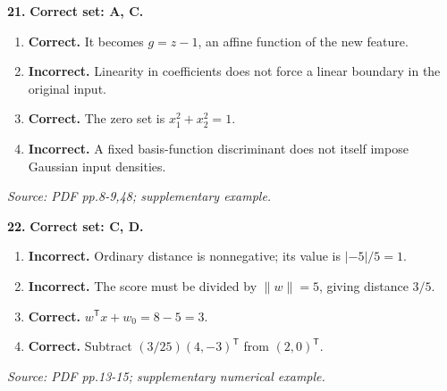 \documentclass[11pt,a4paper]{article}
\begin{document}
\par\noindent\begin{minipage}{\linewidth}
\textbf{21.} \textbf{Correct set: A, C.}
\begin{enumerate}[label=(\Alph*),leftmargin=8mm,itemsep=2pt,topsep=2pt]
\item \textbf{Correct.} It becomes \(g=z-1\), an affine function of the new feature.
\item \textbf{Incorrect.} Linearity in coefficients does not force a linear boundary in the original input.
\item \textbf{Correct.} The zero set is \(x_1^2+x_2^2=1\).
\item \textbf{Incorrect.} A fixed basis-function discriminant does not itself impose Gaussian input densities.
\end{enumerate}
{\footnotesize\textit{Source: PDF pp.8-9,48; supplementary example.}}

\end{minipage}\par\vspace{3mm}
\par\noindent\begin{minipage}{\linewidth}
\textbf{22.} \textbf{Correct set: C, D.}
\begin{enumerate}[label=(\Alph*),leftmargin=8mm,itemsep=2pt,topsep=2pt]
\item \textbf{Incorrect.} Ordinary distance is nonnegative; its value is \(|-5|/5=1\).
\item \textbf{Incorrect.} The score must be divided by \(\|w\|=5\), giving distance \(3/5\).
\item \textbf{Correct.} \(w^{\mathsf T}x+w_0=8-5=3\).
\item \textbf{Correct.} Subtract \((3/25)(4,-3)^{\mathsf T}\) from \((2,0)^{\mathsf T}\).
\end{enumerate}
{\footnotesize\textit{Source: PDF pp.13-15; supplementary numerical example.}}

\end{minipage}\par\vspace{3mm}
\end{document}
